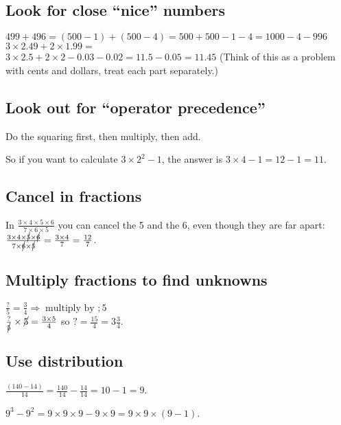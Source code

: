 \documentclass[fullpage,twocolumn]{article}
\begin{document}
\subsection{Look for close ``nice'' numbers}
$499 + 496 = (500 - 1) + (500 - 4 ) = 500 + 500 - 1 - 4 = 1000 - 4 - 996$\\

$3 \times 2.49 + 2 \times 1.99 =$ \\
$ 3 \times 2.5 + 2 \times 2 - 0.03 - 0.02 = 11.5 - 0.05 = 11.45$
(Think of this as a problem with cents and dollars, treat each part separately.)

\subsection{Look out for ``operator precedence''}

Do the squaring first, then multiply, then add.

So if you want to calculate $3 \times 2^2 - 1$,
the answer is $3\times  4 -  1 = 12 - 1 = 11$.

\subsection{Cancel in fractions}

In $\frac{3 \times 4 \times 5 \times 6}{7 \times 6 \times 5}$ you can cancel
the 5 and the 6, even though they are far apart: $\frac{3 \times 4 \times \cancel{5}
\times \cancel{6}}{ 7 \times  \cancel{6} \times \cancel{5}} = \frac{3 \times 4}{7} = \frac{12}{7}$.

\subsection{Multiply fractions to find unknowns}

$\frac{?}{5} = \frac{3}{4} \Rightarrow \; \mbox{multiply by } ; 5$\\
$\frac{?}{\cancel{5}} \times \cancel{5} = \frac{3 \times 5}{4}$ so  $? = \frac{15}{4} = 3\frac{3}{4}$.

\subsection{Use distribution}

$\frac{(140 - 14)}{14} = \frac{140}{14} - \frac{14}{14} = 10 - 1 = 9$.

$9^3 - 9^2 = 9 \times 9 \times 9 - 9 \times 9 = 9 \times 9 \times (9 - 1)$.
\end{document}

